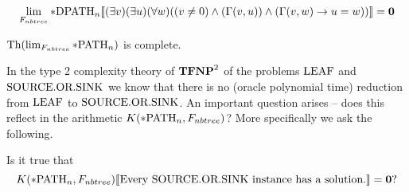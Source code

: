\begin{thrm}
\[\lim_{F_{nbtree}}*\text{DPATH}_n\llbracket(\exists v)(\exists u)(\forall w)((v\not=0)\land (\Gamma(v,u)) \land(\Gamma(v,w) \to u=w))\rrbracket=\textbf{0}\]
\end{thrm}

\begin{crll}
$\text{Th}(\lim_{F_{nbtree}}*\text{PATH}_n)$ is complete.
\end{crll}

In the type 2 complexity theory of $\textbf{TFNP}^2$ of the problems $\text{LEAF}$ and $\text{SOURCE.OR.SINK}$ we know that there is no (oracle polynomial time) reduction from $\text{LEAF}$ to $\text{SOURCE.OR.SINK}$. An important question arises -- does this reflect in the arithmetic $K(*\text{PATH}_n,F_{nbtree})$? More specifically we ask the following.

\begin{ques}
Is it true that
\[K(*\text{PATH}_n,F_{nbtree})\llbracket\text{Every $\text{SOURCE.OR.SINK}$ instance has a solution.}\rrbracket=\textbf{0}?\]
\end{ques}

